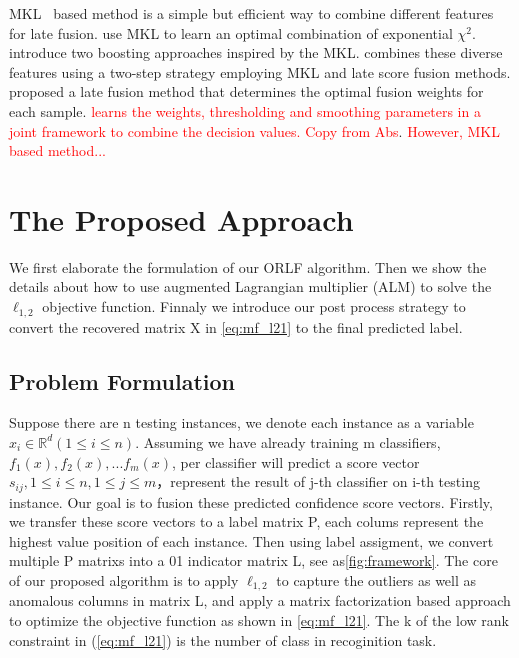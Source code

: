 \documentclass[letterpaper]{article}
\def\dsR{\mathds{R}}
\def\yanred{\textcolor{red}}
\begin{document}
MKL~\cite{Rakotomamonjy2008Simplemkl} based method is a simple but efficient way to combine different features for late fusion. \cite{vedaldi2009multiple} use MKL to learn an optimal combination of exponential ${\chi}^2$. \cite{gehler2009feature} introduce two boosting approaches inspired by the MKL. \cite{natarajan2012multimodal} combines these diverse features using a two-step strategy employing MKL and late score fusion methods. \cite{lai2015learning} proposed a late fusion method that determines the optimal fusion weights for each sample. \yanred{\cite{xuiccv2013feature} learns the weights, thresholding and smoothing parameters in a joint framework to combine the decision values. Copy from Abs}. \yanred{However, MKL based method...} 



\section{The Proposed Approach}
We first elaborate the formulation of our ORLF algorithm. Then we show the details about how to use augmented Lagrangian multiplier (ALM) to solve the $\ell_{1,2}$ objective function. Finnaly we introduce our post process strategy to convert the recovered matrix X in \ref{eq:mf_l21} to the final predicted label.


\subsection{Problem Formulation}
Suppose there are n testing instances, we denote each instance as a variable $x_i{\in}\dsR^{d}(1{\leq}i{\leq}n)$. Assuming we have already training m classifiers, $f_1(x), f_2(x), ... f_m(x)$, per classifier will predict a score vector $s_{ij}, 1{\leq}i{\leq}n, 1{\leq}j{\leq}m $，represent the result of j-th classifier on i-th testing instance. Our goal is to fusion these predicted confidence score vectors. Firstly, we transfer these score vectors to a label matrix P, each colums represent the highest value position of each instance. Then using label assigment, we convert multiple P matrixs into a 01 indicator matrix L, see as{\ref{fig:framework}}.
The core of our proposed algorithm is to apply $\ell_{1,2}$ to capture the outliers as well as anomalous columns in matrix L, and apply a matrix factorization based approach to optimize the objective function as shown in \ref{eq:mf_l21}. The k of the low rank constraint in (\ref{eq:mf_l21}) is the number of class in recoginition task.
\end{document}
